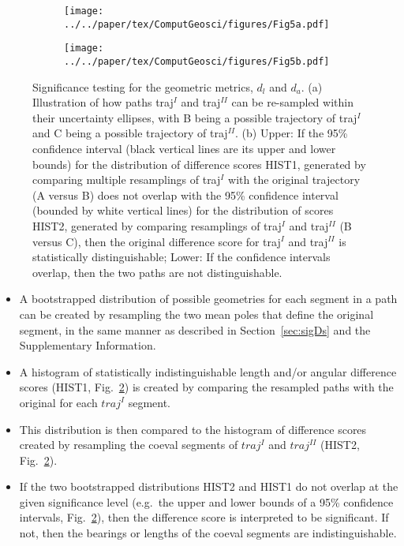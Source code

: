 \begin{figure*}[tbp]
  \captionsetup[subfigure]{singlelinecheck=off,justification=raggedright,aboveskip=-6pt,belowskip=-6pt}
  \centering
  \begin{subfigure}[htbp]{.495\textwidth}
    \centering
    \caption{}\label{fig:Fig5a}
    \texttt{[image: ../../paper/tex/ComputGeosci/figures/Fig5a.pdf]}
  \end{subfigure}
  \begin{subfigure}[htbp]{.495\textwidth}
    \centering
    \caption{}\label{fig:Fig5b}
    \texttt{[image: ../../paper/tex/ComputGeosci/figures/Fig5b.pdf]}
  \end{subfigure}
\caption[Testing on Geometry]{Significance testing for the geometric metrics,
$d_l$ and $d_a$. (a) Illustration of how paths traj$^I$ and traj$^{II}$ can be
re-sampled within their uncertainty ellipses, with B being a possible
trajectory of traj$^I$ and C being a possible trajectory of traj$^{II}$. (b)
Upper: If the 95\% confidence interval (black vertical lines are its upper and
lower bounds) for the distribution of difference scores HIST1, generated by
comparing multiple resamplings of traj$^I$ with the original trajectory (A versus B)
does not overlap with the 95\% confidence interval (bounded by white vertical
lines) for the distribution of scores HIST2, generated by comparing resamplings
of traj$^I$ and traj$^{II}$ (B versus C), then the original difference score for
traj$^I$ and traj$^{II}$ is statistically distinguishable; Lower: If the
confidence intervals overlap, then the two paths are not
distinguishable.}\label{fig:Fig5}
\end{figure*}

\begin{itemize}
\item A bootstrapped distribution of possible geometries for each segment in a
  path can be created by resampling the two mean poles that define the original
  segment, in the same manner as described in Section~\ref{sec:sigDs} and the
  Supplementary Information.
\item A histogram of statistically indistinguishable length and/or angular
  difference scores (HIST1, Fig.~\ref{fig:Fig5b}) is created by comparing the
  resampled paths with the original for each $traj^I$ segment.
\item This distribution is then compared to the histogram of difference scores
  created by resampling the coeval segments of $traj^I$ and $traj^{II}$ (HIST2,
  Fig.~\ref{fig:Fig5b}).
\item If the two bootstrapped distributions HIST2 and HIST1 do not overlap at
  the given significance level (e.g.\ the upper and lower bounds of a 95\%
  confidence intervals, Fig.~\ref{fig:Fig5b}), then the difference score is
  interpreted to be significant. If not, then the bearings or lengths of the
  coeval segments are indistinguishable.
\end{itemize}

